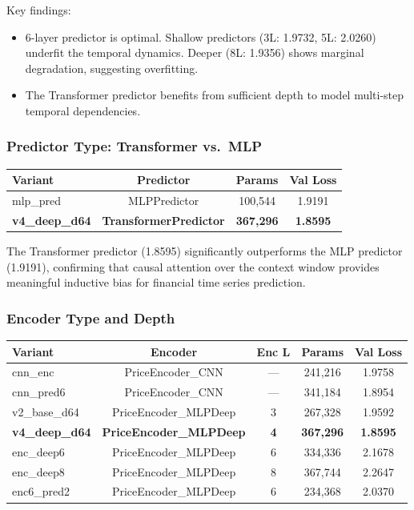 \documentclass[11pt]{article}
\begin{document}
\noindent Key findings:
\begin{itemize}[nosep]
  \item 6-layer predictor is optimal. Shallow predictors (3L: 1.9732, 5L: 2.0260) underfit the temporal dynamics. Deeper (8L: 1.9356) shows marginal degradation, suggesting overfitting.
  \item The Transformer predictor benefits from sufficient depth to model multi-step temporal dependencies.
\end{itemize}

\subsubsection{Predictor Type: Transformer vs.\ MLP}

\begin{center}
\begin{tabular}{lccc}
\toprule
Variant & Predictor & Params & Val Loss \\
\midrule
mlp\_pred & MLPPredictor & 100,544  & 1.9191 \\
\textbf{v4\_deep\_d64} & \textbf{TransformerPredictor} & \textbf{367,296} & \textbf{1.8595} \\
\bottomrule
\end{tabular}
\end{center}

\noindent The Transformer predictor (1.8595) significantly outperforms the MLP predictor (1.9191), confirming that causal attention over the context window provides meaningful inductive bias for financial time series prediction.

\subsubsection{Encoder Type and Depth}

\begin{center}
\begin{tabular}{lcccc}
\toprule
Variant & Encoder & Enc L & Params & Val Loss \\
\midrule
cnn\_enc   & PriceEncoder\_CNN & --- & 241,216 & 1.9758 \\
cnn\_pred6 & PriceEncoder\_CNN & --- & 341,184 & 1.8954 \\
v2\_base\_d64 & PriceEncoder\_MLPDeep & 3 & 267,328 & 1.9592 \\
\textbf{v4\_deep\_d64} & \textbf{PriceEncoder\_MLPDeep} & \textbf{4} & \textbf{367,296} & \textbf{1.8595} \\
enc\_deep6 & PriceEncoder\_MLPDeep & 6 & 334,336 & 2.1678 \\
enc\_deep8 & PriceEncoder\_MLPDeep & 8 & 367,744 & 2.2647 \\
enc6\_pred2 & PriceEncoder\_MLPDeep & 6 & 234,368 & 2.0370 \\
\bottomrule
\end{tabular}
\end{center}
\end{document}
